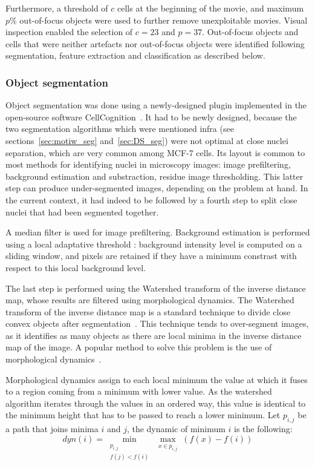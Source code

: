 Furthermore, a threshold of $c$ cells at the beginning of the movie, and maximum $p$\% out-of-focus objects were used to further remove unexploitable movies. Visual inspection enabled the selection of $c=23$ and $p=37$. Out-of-focus objects and cells that were neither artefacts nor out-of-focus objects were identified following segmentation, feature extraction and classification as described below.

\subsubsection{Object segmentation}
Object segmentation was done using a newly-designed plugin implemented in the open-source software CellCognition~\cite{cellcognition}. It had to be newly designed, because the two segmentation algorithms which were mentioned infra (see sections~\ref{sec:motiw_seg} and~\ref{sec:DS_seg}) were not optimal at close nuclei separation, which are very common among MCF-7 cells. Its layout is common to most methods for identifying nuclei in microscopy images: image prefiltering, background estimation and substraction, residue image thresholding. This latter step can produce under-segmented images, depending on the problem at hand. In the current context, it had indeed to be followed by a fourth step to split close nuclei that had been segmented together.

A median filter is used for image prefiltering. Background estimation is performed using a local adaptative threshold : background intensity level is computed on a sliding window, and pixels are retained if they have a minimum constrast with respect to this local background level.

The last step is performed using the Watershed transform of the inverse distance map, whose results are filtered using morphological dynamics. The Watershed transform of the inverse distance map is a standard technique to divide close convex objects after segmentation~\cite[Chapter Geodesic segmentation]{lantuejoul}. This technique tends to over-segment images, as it identifies as many objects as there are local minima in the inverse distance map of the image. A popular method to solve this problem is the use of morphological dynamics~\cite{Soille:2003:MIA:773286}.

Morphological dynamics assign to each local minimum the value at which it fuses to a region coming from a minimum with lower value. As the watershed algorithm iterates through the values in an ordered way, this value is identical to the minimum height that has to be passed to reach a lower minimum. Let $p_{i,j}$ be a path that joins minima $i$ and $j$, the dynamic of minimum $i$ is the following:
\[ dyn(i) = \min_{\substack{p_{i,j} \\ f (j)<f (i)}} \max_{\substack{x\in p_{i,j}}} (f(x) - f(i))\]

